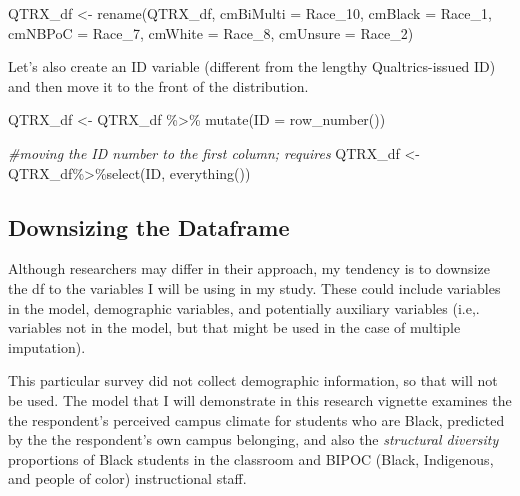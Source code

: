 \documentclass[
  11pt,
]{book}
\newenvironment{Shaded}{\begin{snugshade}}{\end{snugshade}}
\newcommand{\AttributeTok}[1]{\textcolor[rgb]{0.77,0.63,0.00}{#1}}
\newcommand{\CommentTok}[1]{\textcolor[rgb]{0.56,0.35,0.01}{\textit{#1}}}
\newcommand{\FunctionTok}[1]{\textcolor[rgb]{0.00,0.00,0.00}{#1}}
\newcommand{\NormalTok}[1]{#1}
\newcommand{\OtherTok}[1]{\textcolor[rgb]{0.56,0.35,0.01}{#1}}
\newcommand{\SpecialCharTok}[1]{\textcolor[rgb]{0.00,0.00,0.00}{#1}}
\begin{document}
\begin{Shaded}
\begin{Highlighting}[]
\NormalTok{QTRX\_df }\OtherTok{\textless{}{-}} \FunctionTok{rename}\NormalTok{(QTRX\_df, }\AttributeTok{cmBiMulti =}\NormalTok{ Race\_10, }\AttributeTok{cmBlack =}\NormalTok{ Race\_1, }\AttributeTok{cmNBPoC =}\NormalTok{ Race\_7, }\AttributeTok{cmWhite =}\NormalTok{ Race\_8, }\AttributeTok{cmUnsure =}\NormalTok{ Race\_2)}
\end{Highlighting}
\end{Shaded}

Let's also create an ID variable (different from the lengthy Qualtrics-issued ID) and then move it to the front of the distribution.

\begin{Shaded}
\begin{Highlighting}[]
\NormalTok{QTRX\_df }\OtherTok{\textless{}{-}}\NormalTok{ QTRX\_df }\SpecialCharTok{\%\textgreater{}\%} \FunctionTok{mutate}\NormalTok{(}\AttributeTok{ID =} \FunctionTok{row\_number}\NormalTok{())}

\CommentTok{\#moving the ID number to the first column; requires }
\NormalTok{QTRX\_df }\OtherTok{\textless{}{-}}\NormalTok{ QTRX\_df}\SpecialCharTok{\%\textgreater{}\%}\FunctionTok{select}\NormalTok{(ID, }\FunctionTok{everything}\NormalTok{())}
\end{Highlighting}
\end{Shaded}

\hypertarget{downsizing-the-dataframe}{%
\subsection{Downsizing the Dataframe}\label{downsizing-the-dataframe}}

Although researchers may differ in their approach, my tendency is to downsize the df to the variables I will be using in my study. These could include variables in the model, demographic variables, and potentially auxiliary variables (i.e,. variables not in the model, but that might be used in the case of multiple imputation).

This particular survey did not collect demographic information, so that will not be used. The model that I will demonstrate in this research vignette examines the the respondent's perceived campus climate for students who are Black, predicted by the the respondent's own campus belonging, and also the \emph{structural diversity} \citep{lewis_black_2019} proportions of Black students in the classroom and BIPOC (Black, Indigenous, and people of color) instructional staff.
\end{document}
